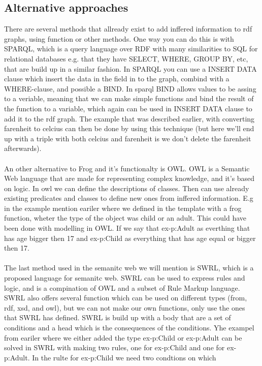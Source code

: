 \subsection{Alternative approaches}
There are several methods that allready exist to add inffered information to rdf graphs, using function or other methods. 
One way you can do this is with SPARQL, which is a query language over RDF with many similarities to SQL for relational 
databases e.g. that they have SELECT, WHERE, GROUP BY, etc, that are build up in a similar fashion. In SPARQL you can use 
a INSERT DATA clause which insert the data in the field in to the graph, combind with a WHERE-clause, and possible a BIND. 
In sparql BIND allows values to be assing to a veriable, meaning that we can make simple functions and bind the result of 
the function to a variable, which again can be used in INSERT DATA clause to add it to the rdf graph. The example that was
described earlier, with converting farenheit to celcius can then be done by using this technique (but here we'll end up with a 
triple with both celcius and farenheit is we don't delete the farenheit afterwards). 
\\ \\
An other alternative to Frog and it's functionalty is OWL. OWL is a Semantic Web language that are made for representing complex 
knowledge, and it's based on logic. In owl we can define the descriptions of classes. Then can use already existing 
predicates and classes to define new ones from inffered information. E.g in the example mention eariler where we defined in the template
with a frog function, wheter the type of the object was child or an adult. This could have been done with modelling in OWL. If we say that  
ex-p:Adult as everthing that has age bigger then 17 and ex-p:Child as everything that has age equal or bigger then 17.
\\ \\
The last method used in the semanitc web we will mention is SWRL, which is a proposed language for semanitc web. SWRL can be used 
to express rules and logic, and is a compination of OWL and a subset of Rule Markup language. SWRL also offers several function 
which can be used on different types (from, rdf, xsd, and owl), but we can not make our own functions, only use the ones that 
SWRL has defined. SWRL is build up with a body that are a set of conditions and a head which is the consequences of the
conditions. Yhe exampel from eariler where we either added the type ex-p:Child or ex-p:Adult can be solved in SWRL with 
making two rules, one for ex-p:Child and one for ex-p:Adult. In the rulte for ex-p:Child we need two condtions on which 

